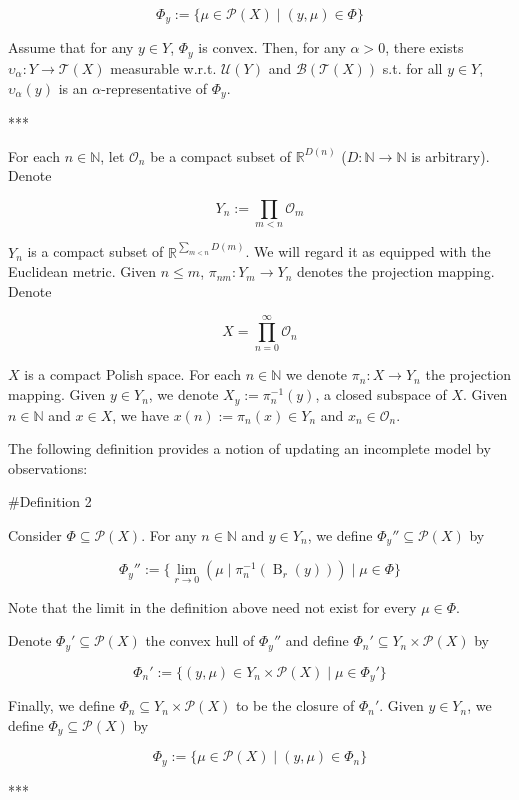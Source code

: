 \documentclass[a4paper]{article}
\newcommand{\Nats}{\mathbb{N}}
\newcommand{\Reals}{\mathbb{R}}
\newcommand{\Prob}{\mathcal{P}}
\newcommand{\Ob}{\mathcal{O}}
\newcommand{\T}{\mathcal{T}}
\newcommand{\B}{\mathcal{B}}
\newcommand{\UM}{\mathcal{U}}
\newcommand{\Ball}{\operatorname{B}}
\begin{document}
$${\Phi_y := \{\mu \in \Prob(X) \mid (y,\mu) \in \Phi\}}$$ 

Assume that for any ${y \in Y}$, ${\Phi_y}$ is convex. Then, for any $\alpha > 0$, there exists ${\upsilon_\alpha: Y \rightarrow \T(X)}$ measurable w.r.t. ${\UM(Y)}$ and ${\B(\T(X))}$ s.t. for all ${y \in Y}$, ${\upsilon_\alpha(y)}$ is an $\alpha$-representative of ${\Phi_y}$.

***

For each ${n \in \Nats}$, let ${\Ob_n}$ be a compact subset of $\Reals^{D(n)}$ ($D: \Nats \rightarrow \Nats$ is arbitrary). Denote 

$${Y_n:=\prod_{m < n} \Ob_m}$$

${Y_n}$ is a compact subset of ${\Reals^{\sum_{m < n} D(m)}}$. We will regard it as equipped with the Euclidean metric. Given ${n \leq m}$, ${\pi_{nm}: Y_m \rightarrow Y_n}$ denotes the projection mapping. Denote 

$${X = \prod_{n = 0}^\infty \Ob_n}$$

${X}$ is a compact Polish space. For each ${n \in \Nats}$ we denote ${\pi_{n}: X \rightarrow Y_n}$ the projection mapping. Given ${y \in Y_n}$, we denote ${X_y:=\pi_{n}^{-1}(y)}$, a closed subspace of ${X}$. Given $n \in \Nats$ and $x \in X$, we have $x(n):=\pi_{n}(x) \in Y_n$ and $x_n \in \Ob_n$.

The following definition provides a notion of updating an incomplete model by observations:

\#Definition 2

Consider ${\Phi \subseteq \Prob(X)}$. For any ${n \in \Nats}$ and ${y \in Y_n}$, we define ${\Phi_y'' \subseteq \Prob(X)}$ by

$$\Phi_y'':=\{\lim_{r \rightarrow 0} (\mu \mid \pi_{n}^{-1}(\Ball_r(y))) \mid \mu \in \Phi\}$$

Note that the limit in the definition above need not exist for every ${\mu \in \Phi}$.

Denote ${\Phi_y' \subseteq \Prob(X)}$ the convex hull of ${\Phi_y''}$ and define ${\Phi_n' \subseteq Y_n \times \Prob(X)}$ by

$$\Phi_n':=\{(y,\mu) \in Y_n \times \Prob(X) \mid \mu \in \Phi_y'\}$$

Finally, we define ${\Phi_n \subseteq Y_n \times \Prob(X)}$ to be the closure of ${\Phi_n'}$. Given ${y \in Y_n}$, we define ${\Phi_y \subseteq \Prob(X)}$ by

$$\Phi_y:=\{\mu \in \Prob(X) \mid (y,\mu) \in \Phi_n\}$$

***
\end{document}
